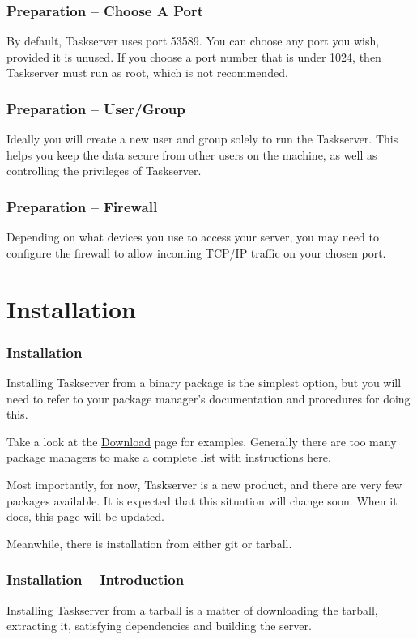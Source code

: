 \documentclass[t,handout]{beamer}
\begin{document}
\begin{frame}[fragile]\frametitle{Preparation -- Choose A  Port}
	\vfill
	By default, Taskserver uses port 53589. You can choose any port you wish, provided it is unused. If you choose a port number that is under 1024, then Taskserver must run as root, which is not recommended.
	\vfill
\end{frame}

\begin{frame}[fragile]\frametitle{Preparation -- User/Group}
	\vfill
    Ideally you will create a new user and group solely to run the Taskserver. This helps you keep the data secure from other users on the machine, as well as controlling the privileges of Taskserver.
	\vfill
\end{frame}

\begin{frame}[fragile]\frametitle{Preparation -- Firewall}
	\vfill
	Depending on what devices you use to access your server, you may need to configure the firewall to allow incoming TCP/IP traffic on your chosen port.
	\vfill
\end{frame}

\section{Installation}

\begin{frame}[fragile]\frametitle{Installation}
    \vfill
    Installing Taskserver from a binary package is the simplest option, but you will need to refer to your package manager's documentation and procedures for doing this.

    Take a look at the \href{http://taskwarrior.org/download/#dist}{Download} page for examples. Generally there are too many package managers to make a complete list with instructions here.

    Most importantly, for now, Taskserver is a new product, and there are very few packages available.  It is expected that this situation will change soon.  When it does, this page will be updated.

    Meanwhile, there is installation from either git or tarball.
\end{frame}

\begin{frame}[fragile]\frametitle{Installation -- Introduction}
    \vfill
    Installing Taskserver from a tarball is a matter of downloading the tarball, extracting it, satisfying dependencies and building the server.
\end{frame}
\end{document}
